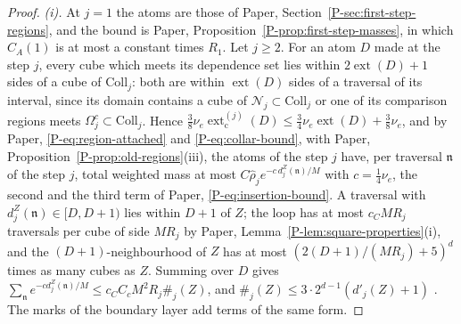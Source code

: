 \documentclass[11pt]{preprint}
\numberwithin{equation}{section}
\theoremstyle{definition}
\theoremstyle{remark}
\theoremstyle{plain}
\begin{document}
\begin{proof}
\emph{(i).} At $j = 1$ the atoms are those of Paper, Section~\ref{P-sec:first-step-regions}, and the bound is Paper, Proposition~\ref{P-prop:first-step-masses}, in which $C_A(1)$ is at most a constant times $R_1$. Let $j \geq 2$. For an atom $D$ made at the step $j$, every cube which meets its dependence set lies within $2\operatorname{ext}(D) + 1$ sides of a cube of $\mathrm{Coll}_j$: both are within $\operatorname{ext}(D)$ sides of a traversal of its interval, since its domain contains a cube of $\mathcal N_j \subset \mathrm{Coll}_j$ or one of its comparison regions meets $\Omega_j^c \subset \mathrm{Coll}_j$. Hence $\frac38\nu_e\operatorname{ext}^{(j)}_{\mathrm c}(D) \leq \frac34\nu_e\operatorname{ext}(D) + \frac38\nu_e$, and by Paper, \eqref{P-eq:region-attached} and \eqref{P-eq:collar-bound}, with Paper, Proposition~\ref{P-prop:old-regions}(iii), the atoms of the step $j$ have, per traversal $\mathfrak n$ of the step $j$, total weighted mass at most $C\hat\rho_je^{-c\,d^Z_j(\mathfrak n)/M}$ with $c = \frac14\nu_e$, the second and the third term of Paper, \eqref{P-eq:insertion-bound}. A traversal with $d^Z_j(\mathfrak n) \in [D, D + 1)$ lies within $D + 1$ of $Z$; the loop has at most $c_CMR_j$ traversals per cube of side $MR_j$ by Paper, Lemma~\ref{P-lem:square-properties}(i), and the $(D + 1)$-neighbourhood of $Z$ has at most $(2(D + 1)/(MR_j) + 5)^d$ times as many cubes as $Z$. Summing over $D$ gives $\sum_{\mathfrak n}e^{-cd^Z_j(\mathfrak n)/M} \leq c_CC_cM^2R_j\#_j(Z)$, and $\#_j(Z) \leq 3 \cdot 2^{d-1}(d'_j(Z) + 1)$ \cite[p.~384]{BalabanLFR2}. The marks of the boundary layer add terms of the same form.


\end{proof}
\end{document}
